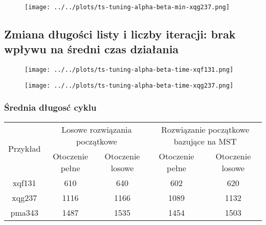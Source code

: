 \documentclass{article}
\begin{document}
    \begin{figure}[h!]
        \centering
        \texttt{[image: ../../plots/ts-tuning-alpha-beta-min-xqg237.png]}
    \end{figure}

\newpage

\subsection*{Zmiana długości listy i liczby iteracji: brak wpływu na średni czas działania}
    \begin{figure}[h!]
        \centering
        \texttt{[image: ../../plots/ts-tuning-alpha-beta-time-xqf131.png]}
    \end{figure}
    
    \begin{figure}[h!]
        \centering
        \texttt{[image: ../../plots/ts-tuning-alpha-beta-time-xqg237.png]}
    \end{figure}

\newpage

\subsubsection*{Średnia długosć cyklu}
\begin{table}[h!]
    \centering
    \begin{tabular}{|c|c|c|c|c|}
        \hline 
        \multirow{2}{*}{Przykład} & \multicolumn{2}{|c|}{Losowe rozwiązania początkowe} & \multicolumn{2}{|c|}{Rozwiązanie początkowe bazujące na MST} \\
        \cline{2-5}
        \cline{2-5} & Otoczenie pełne & Otoczenie losowe & Otoczenie pełne & Otoczenie losowe \\
        \hline
        xqf131 & 610 & 640 & 602 & 620 \\
        \hline
        xqg237 & 1116 & 1166 & 1089 & 1132 \\
        \hline
        pma343 & 1487 & 1535 & 1454 & 1503 \\
        \hline
    \end{tabular}
\end{table}
\end{document}
